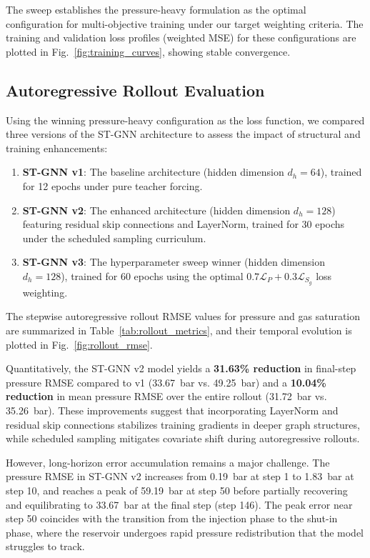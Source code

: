 \documentclass[10pt,twocolumn]{article}
\begin{document}
The sweep establishes the pressure-heavy formulation as the optimal configuration for multi-objective training under our target weighting criteria. The training and validation loss profiles (weighted MSE) for these configurations are plotted in Fig.~\ref{fig:training_curves}, showing stable convergence.

\subsection{Autoregressive Rollout Evaluation}
Using the winning pressure-heavy configuration as the loss function, we compared three versions of the ST-GNN architecture to assess the impact of structural and training enhancements:
\begin{enumerate}
    \item \textbf{ST-GNN v1}: The baseline architecture (hidden dimension $d_h = 64$), trained for 12 epochs under pure teacher forcing.
    \item \textbf{ST-GNN v2}: The enhanced architecture (hidden dimension $d_h = 128$) featuring residual skip connections and LayerNorm, trained for 30 epochs under the scheduled sampling curriculum.
    \item \textbf{ST-GNN v3}: The hyperparameter sweep winner (hidden dimension $d_h = 128$), trained for 60 epochs using the optimal $0.7\mathcal{L}_P + 0.3\mathcal{L}_{S_g}$ loss weighting.
\end{enumerate}

The stepwise autoregressive rollout RMSE values for pressure and gas saturation are summarized in Table~\ref{tab:rollout_metrics}, and their temporal evolution is plotted in Fig.~\ref{fig:rollout_rmse}.

Quantitatively, the ST-GNN v2 model yields a \textbf{31.63\% reduction} in final-step pressure RMSE compared to v1 (33.67~bar vs. 49.25~bar) and a \textbf{10.04\% reduction} in mean pressure RMSE over the entire rollout (31.72~bar vs. 35.26~bar). These improvements suggest that incorporating LayerNorm and residual skip connections stabilizes training gradients in deeper graph structures, while scheduled sampling mitigates covariate shift during autoregressive rollouts.

However, long-horizon error accumulation remains a major challenge. The pressure RMSE in ST-GNN v2 increases from 0.19~bar at step 1 to 1.83~bar at step 10, and reaches a peak of 59.19~bar at step 50 before partially recovering and equilibrating to 33.67~bar at the final step (step 146). The peak error near step 50 coincides with the transition from the injection phase to the shut-in phase, where the reservoir undergoes rapid pressure redistribution that the model struggles to track. 
\end{document}
